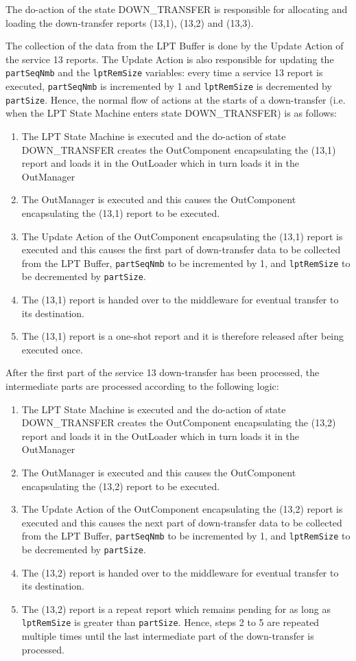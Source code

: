 \documentclass{pnp_article}
\begin{document}
The do-action of the state DOWN\_TRANSFER is responsible for allocating and loading the down-transfer reports (13,1), (13,2) and (13,3).

The collection of the data from the LPT Buffer is done by the Update Action of the service 13 reports. The Update Action is also responsible for updating the \texttt{partSeqNmb} and the \texttt{lptRemSize} variables: every time a service 13 report is executed, \texttt{partSeqNmb} is incremented by 1 and \texttt{lptRemSize} is decremented by \texttt{partSize}. Hence, the normal flow of actions at the starts of a down-transfer (i.e. when the LPT State Machine enters state DOWN\_TRANSFER) is as follows:

\begin{enumerate}
\item The LPT State Machine is executed and the do-action of state DOWN\_TRANSFER creates the OutComponent encapsulating the (13,1) report and loads it in the OutLoader which in turn loads it in the OutManager
\item The OutManager is executed and this causes the OutComponent encapsulating the (13,1) report to be executed.
\item The Update Action of the OutComponent encapsulating the (13,1) report is executed and this causes the first part of down-transfer data to be collected from the LPT Buffer, \texttt{partSeqNmb} to be incremented by 1, and \texttt{lptRemSize} to be decremented by \texttt{partSize}.
\item The (13,1) report is handed over to the middleware for eventual transfer to its destination.
\item The (13,1) report is a one-shot report and it is therefore released after being executed once.
\end{enumerate}

After the first part of the service 13 down-transfer has been processed, the intermediate parts are processed according to the following logic:

\begin{enumerate}
\item The LPT State Machine is executed and the do-action of state DOWN\_TRANSFER creates the OutComponent encapsulating the (13,2) report and loads it in the OutLoader which in turn loads it in the OutManager
\item The OutManager is executed and this causes the OutComponent encapsulating the (13,2) report to be executed.
\item The Update Action of the OutComponent encapsulating the (13,2) report is executed and this causes the next part of down-transfer data to be collected from the LPT Buffer, \texttt{partSeqNmb} to be incremented by 1, and \texttt{lptRemSize} to be decremented by \texttt{partSize}.
\item The (13,2) report is handed over to the middleware for eventual transfer to its destination.
\item The (13,2) report is a repeat report which remains pending for as long as \texttt{lptRemSize} is greater than \texttt{partSize}. Hence, steps 2 to 5 are repeated multiple times until the last intermediate part of the down-transfer is processed.
\end{enumerate}
\end{document}
